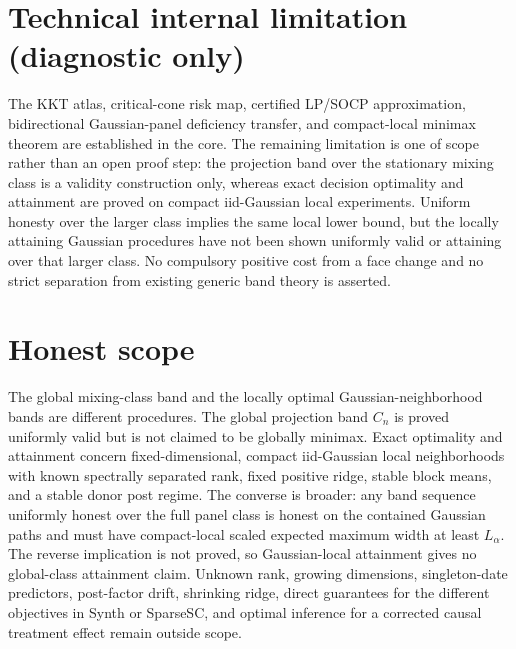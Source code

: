 \documentclass{article}
\begin{document}
\section*{Technical internal limitation (diagnostic only)}

The KKT atlas, critical-cone risk map, certified LP/SOCP approximation, bidirectional Gaussian-panel deficiency transfer, and compact-local minimax theorem are established in the core. The remaining limitation is one of scope rather than an open proof step: the projection band over the stationary mixing class is a validity construction only, whereas exact decision optimality and attainment are proved on compact iid-Gaussian local experiments. Uniform honesty over the larger class implies the same local lower bound, but the locally attaining Gaussian procedures have not been shown uniformly valid or attaining over that larger class. No compulsory positive cost from a face change and no strict separation from existing generic band theory is asserted.

\section{Honest scope}

The global mixing-class band and the locally optimal Gaussian-neighborhood bands are different procedures. The global projection band \(C_n\) is proved uniformly valid but is not claimed to be globally minimax. Exact optimality and attainment concern fixed-dimensional, compact iid-Gaussian local neighborhoods with known spectrally separated rank, fixed positive ridge, stable block means, and a stable donor post regime. The converse is broader: any band sequence uniformly honest over the full panel class is honest on the contained Gaussian paths and must have compact-local scaled expected maximum width at least \(L_\alpha\). The reverse implication is not proved, so Gaussian-local attainment gives no global-class attainment claim. Unknown rank, growing dimensions, singleton-date predictors, post-factor drift, shrinking ridge, direct guarantees for the different objectives in Synth or SparseSC, and optimal inference for a corrected causal treatment effect remain outside scope.
\end{document}
